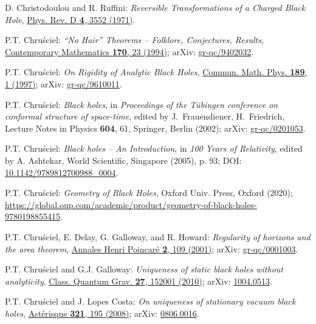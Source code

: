 \begin{thebibliography}{123}
D. Christodoulou and R. Ruffini:
{\em Reversible Transformations of a Charged Black Hole},
\href{https://doi.org/10.1103/PhysRevD.4.3552}{Phys. Rev. D {\bf 4}, 3552 (1971)}.

P.T. Chru\'sciel:
{\em ``No Hair'' Theorems -- Folklore, Conjectures, Results},
\href{https://doi.org/10.1090/conm/170}{Contemporary Mathematics {\bf 170}, 23 (1994)};
arXiv: \href{https://arxiv.org/abs/gr-qc/9402032}{gr-qc/9402032}.

P.T. Chru\'sciel: {\em On Rigidity of Analytic Black Holes},
\href{https://doi.org/10.1007/s002200050187}{Commun. Math. Phys. {\bf 189}, 1 (1997)};
arXiv: \href{https://arxiv.org/abs/gr-qc/9610011}{gr-qc/9610011}.

P.T. Chru\'sciel: {\em Black holes},
in {\em Proceedings of the T\"ubingen conference on conformal structure of
space-time}, edited by J.~Frauendiener, H.~Friedrich,
Lecture Notes in Physics {\bf 604}, 61,
Springer, Berlin (2002);
arXiv: \href{https://arxiv.org/abs/gr-qc/0201053}{gr-qc/0201053}.

P.T. Chru\'sciel: {\em Black holes -- An Introduction},
in {\em 100 Years of Relativity}, edited by A. Ashtekar,
World Scientific, Singapore (2005), p. 93;
DOI: \href{https://doi.org/10.1142/9789812700988_0004}{10.1142/9789812700988\_0004}.

P.T. Chru\'sciel: {\em Geometry of Black Holes},
Oxford Univ. Press, Oxford (2020);
{\footnotesize \url{https://global.oup.com/academic/product/geometry-of-black-holes-9780198855415}}.

P.T. Chru\'sciel, E. Delay, G. Galloway, and R. Howard:
{\em Regularity of horizons and the area theorem},
\href{https://doi.org/10.1007/PL00001029}{Annales Henri Poincaré {\bf 2}, 109 (2001)};
arXiv: \href{https://arxiv.org/abs/gr-qc/0001003}{gr-qc/0001003}.

P.T. Chru\'sciel and G.J. Galloway:
{\em Uniqueness of static black holes without analyticity},
\href{https://doi.org/10.1088/0264-9381/27/15/152001}{Class. Quantum Grav. {\bf 27}, 152001 (2010)};
arXiv: \href{https://arxiv.org/abs/1004.0513}{1004.0513}.

P.T. Chru\'sciel and J. Lopes Costa:
{\em On uniqueness of stationary vacuum black holes},
\href{http://www.numdam.org/item/AST_2008__321__195_0/}{Astérisque {\bf 321}, 195 (2008)};
arXiv: \href{https://arxiv.org/abs/0806.0016}{0806.0016}.


\end{thebibliography}

